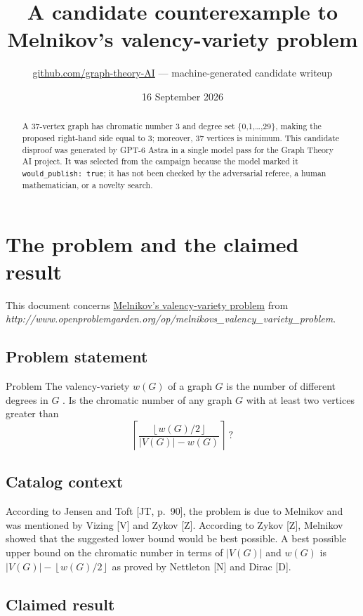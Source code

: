 \documentclass[
  11pt,
  a4paper,
]{article}
\title{A candidate counterexample to Melnikov's valency-variety problem}
\author{\href{https://github.com/graph-theory-AI}{github.com/graph-theory-AI}
--- machine-generated candidate writeup}
\date{16 September 2026}
\providecommand{\ceil}[1]{\left\lceil #1\right\rceil}
\providecommand{\floor}[1]{\left\lfloor #1\right\rfloor}
\begin{document}
\maketitle
\begin{abstract}
A 37-vertex graph has chromatic number 3 and degree set
\{0,1,\ldots,29\}, making the proposed right-hand side equal to 3;
moreover, 37 vertices is minimum. This candidate disproof was generated
by GPT-6 Astra in a single model pass for the Graph Theory AI project.
It was selected from the campaign because the model marked it
\texttt{would\_publish:\ true}; it has not been checked by the
adversarial referee, a human mathematician, or a novelty search.
\end{abstract}

\section{The problem and the claimed
result}\label{the-problem-and-the-claimed-result}

This document concerns
\href{https://graph-theory-ai.github.io/graph-conjectures/op/melnikovs_valency_variety_problem/}{Melnikov's
valency-variety problem} from
\emph{http://www.openproblemgarden.org/op/melnikovs\_valency\_variety\_problem}.

\subsection{Problem statement}\label{problem-statement}

Problem The valency-variety \(w(G)\) of a graph \(G\) is the number of
different degrees in \(G\) . Is the chromatic number of any graph \(G\)
with at least two vertices greater than
\[\ceil{ \frac{\floor{w(G)/2}}{|V(G)| - w(G)} } ~ ?\]

\subsection{Catalog context}\label{catalog-context}

According to Jensen and Toft {[}JT, p.~90{]}, the problem is due to
Melnikov and was mentioned by Vizing {[}V{]} and Zykov {[}Z{]}.
According to Zykov {[}Z{]}, Melnikov showed that the suggested lower
bound would be best possible. A best possible upper bound on the
chromatic number in terms of \(|V(G)|\) and \(w(G)\) is
\(|V(G)| - \floor{ w(G) / 2 }\) as proved by Nettleton {[}N{]} and Dirac
{[}D{]}.

\subsection{Claimed result}\label{claimed-result}
\end{document}
